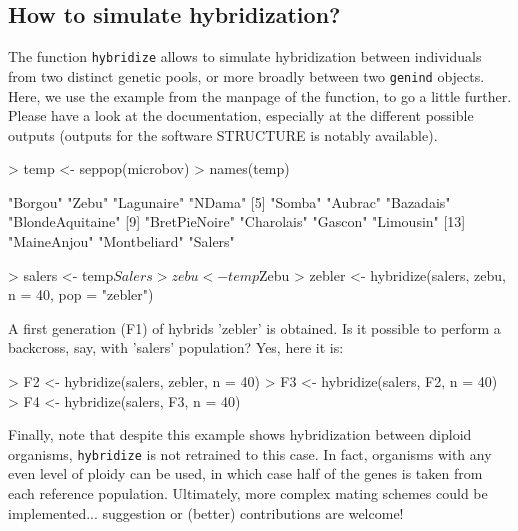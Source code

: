 \documentclass{article}
\begin{document}
\subsection{How to simulate hybridization?}
The function \texttt{hybridize} allows to simulate hybridization between
individuals from two distinct genetic pools, or more broadly between
two \texttt{genind} objects.
Here, we use the example from the manpage of the function, to go a
little further.
Please have a look at the documentation, especially at the different
possible outputs (outputs for the software STRUCTURE is notably available).
\begin{Schunk}
\begin{Sinput}
> temp <- seppop(microbov)
> names(temp)
\end{Sinput}
\begin{Soutput}
 [1] "Borgou"          "Zebu"            "Lagunaire"       "NDama"          
 [5] "Somba"           "Aubrac"          "Bazadais"        "BlondeAquitaine"
 [9] "BretPieNoire"    "Charolais"       "Gascon"          "Limousin"       
[13] "MaineAnjou"      "Montbeliard"     "Salers"         
\end{Soutput}
\begin{Sinput}
> salers <- temp$Salers
> zebu <- temp$Zebu
> zebler <- hybridize(salers, zebu, n = 40, pop = "zebler")
\end{Sinput}
\end{Schunk}

\noindent A first generation (F1) of hybrids 'zebler' is obtained.
Is it possible to perform a backcross, say, with 'salers' population?
Yes, here it is:
\begin{Schunk}
\begin{Sinput}
> F2 <- hybridize(salers, zebler, n = 40)
> F3 <- hybridize(salers, F2, n = 40)
> F4 <- hybridize(salers, F3, n = 40)
\end{Sinput}
\end{Schunk}
Finally, note that despite this example shows hybridization between
diploid organisms, \texttt{hybridize} is not retrained to this case.
In fact, organisms with any even level of ploidy can be used, in which
case half of the genes is taken from each reference population.
Ultimately, more complex mating schemes could be
implemented... suggestion or (better) contributions are welcome!
\end{document}
